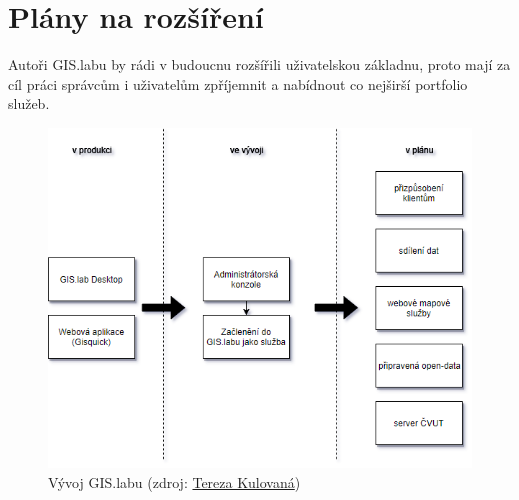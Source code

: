 \section{Plány na rozšíření}
\label{vision}

Autoři GIS.labu by rádi v budoucnu rozšířili uživatelskou základnu,
proto mají za cíl práci správcům i uživatelům zpříjemnit a nabídnout
co nejširší portfolio služeb.

\begin{figure}[H] \centering
    \includegraphics[width=350pt]{./pictures/gislab_road_map.png}
    \caption[Vývoj GIS.labu]{Vývoj GIS.labu (zdroj:
	\href{}{Tereza Kulovaná})}
    \label{fig:gislab-roadmap}
\end{figure}

